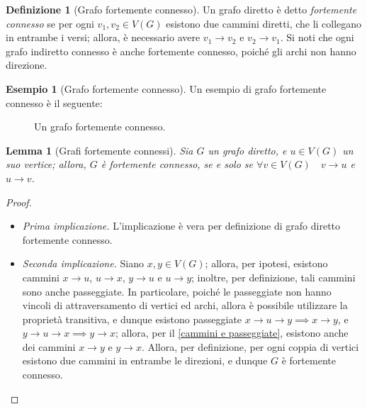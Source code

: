 \documentclass[14pt]{extreport}
\newtheorem{lemma}{Lemma}[subsection]
\theoremstyle{definition}
\newtheorem{definition}{Definizione}[subsection]
\theoremstyle{definition}
\newtheorem{example}{Esempio}[subsection]
\begin{document}
\begin{definition}[Grafo fortemente connesso]
    Un grafo diretto è detto \textit{fortemente connesso} se per ogni $v_1, v_2 \in V(G)$ esistono due cammini diretti, che li collegano in entrambe i versi; allora, è necessario avere $v_1 \rightarrow v_2$ e $v_2 \rightarrow v_1$. Si noti che ogni grafo indiretto connesso è anche fortemente connesso, poiché gli archi non hanno direzione.
\end{definition}

\begin{example}[Grafo fortemente connesso]
    Un esempio di grafo fortemente connesso è il seguente:

    \begin{figure}[H]
        \centering
        \caption{Un grafo fortemente connesso.}
    \end{figure}
\end{example}

\begin{lemma}[Grafi fortemente connessi]
    Sia $G$ un grafo diretto, e $u \in V(G)$ un suo vertice; allora, $G$ è fortemente connesso, se e solo se $\forall v \in V(G) \quad v \rightarrow u$ e $u \rightarrow v$.
\end{lemma}

\begin{proof}
    \hspace{0.7cm}
    \begin{itemize}
        \item[] \textit{Prima implicazione.} L'implicazione è vera per definizione di grafo diretto fortemente connesso.
        \item[] \textit{Seconda implicazione.} Siano $x, y \in V(G)$; allora, per ipotesi, esistono cammini $x \rightarrow u$, $u \rightarrow x$, $y \rightarrow u$ e $u \rightarrow y$; inoltre, per definizione, tali cammini sono anche passeggiate. In particolare, poiché le passeggiate non hanno vincoli di attraversamento di vertici ed archi, allora è possibile utilizzare la proprietà transitiva, e dunque esistono passeggiate $x \rightarrow u \rightarrow y \implies x \rightarrow y$, e $y \rightarrow u \rightarrow x \implies y \rightarrow x$; allora, per il \cref{cammini e passeggiate}, esistono anche dei cammini $x \rightarrow y$ e $y \rightarrow x$. Allora, per definizione, per ogni coppia di vertici esistono due cammini in entrambe le direzioni, e dunque $G$ è fortemente connesso.
    \end{itemize}
\end{proof}
\end{document}
